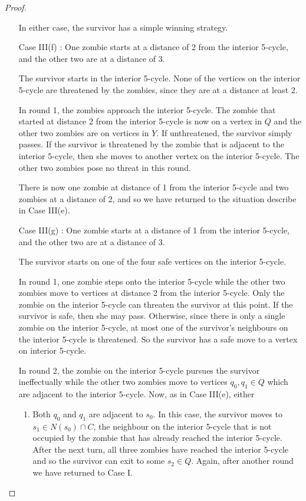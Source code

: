 \begin{proof}
\begin{enumerate}[I.]
In either case, the survivor has a simple winning strategy.

\item[Case III(f)]: One zombie starts at a distance of 2 from the interior 5-cycle, and the other two are at a distance of 3.

The survivor starts in the interior 5-cycle. None of the vertices on the interior 5-cycle are threatened by the zombies, since they are at a distance at least 2.

In round 1, the zombies approach the interior 5-cycle. The zombie that started at distance 2 from the interior 5-cycle is now on a vertex in $Q$ and the other two
zombies are on vertices in $Y$. If unthreatened, the survivor simply passes.
If the survivor is threatened by the zombie that is adjacent to the interior 5-cycle, then she moves to another vertex on the interior 5-cycle. The other two zombies
pose no threat in this round.

There is now one zombie at distance of 1 from the interior 5-cycle and two zombies at a distance of 2, and so we have returned to the situation describe in Case III(e).

\item[Case III(g)]: One zombie starts at a distance of 1 from the interior 5-cycle, and the other two are at a distance of 3.

The survivor starts on one of the four safe vertices on the interior 5-cycle.

In round 1, one zombie steps onto the interior 5-cycle while the other two zombies move to vertices at distance 2 from the interior 5-cycle.
Only the zombie on the interior 5-cycle can threaten the survivor at this point. If the survivor is safe, then she may pass. Otherwise, since there is
only a single zombie on the interior 5-cycle, at most one of the survivor's neighbours on the interior 5-cycle is threatened.
So the survivor has a safe move to a vertex on interior 5-cycle.

In round 2, the zombie on the interior 5-cycle pursues the survivor ineffectually while the other two zombies move to vertices $q_0, q_1 \in Q$ which are
adjacent to the interior 5-cycle. Now, as in Case III(e), either

\begin{enumerate}
\item Both $q_0$ and $q_1$ are adjacent to $s_0$. In this case, the survivor moves to $s_1 \in N(s_0) \cap C$, the neighbour on the interior 5-cycle that is not occupied
by the zombie that has already reached the interior 5-cycle. After the next turn, all three zombies have reached the interior 5-cycle and so the survivor can
exit to some $s_2 \in Q$. Again, after another round we have returned to Case I.


\end{enumerate}
\end{enumerate}
\end{proof}
